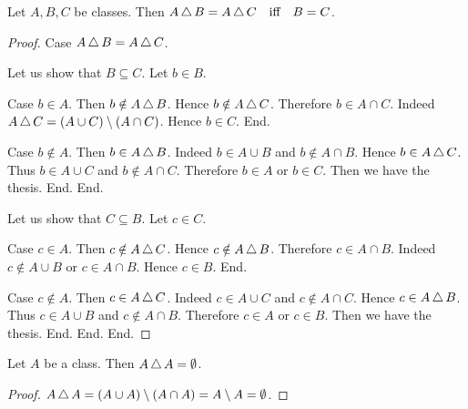 \documentclass[10pt]{article}
\begin{document}
  \begin{forthel}
    \begin{proposition}
      Let $A, B, C$ be classes.
      Then $A \mathop{\triangle} B = A \mathop{\triangle} C \quad \text{iff} \quad B = C$.
    \end{proposition}
    \begin{proof}
      Case $A \mathop{\triangle} B = A \mathop{\triangle} C$.

        Let us show that $B \subseteq C$.
          Let $b \in B$.

          Case $b \in A$.
            Then $b \notin A \mathop{\triangle} B$.
            Hence $b \notin A \mathop{\triangle} C$.
            Therefore $b \in A \cap C$.
            Indeed $A \mathop{\triangle} C = (A \cup C) \setminus (A \cap C)$.
            Hence $b \in C$.
          End.

          Case $b \notin A$.
            Then $b \in A \mathop{\triangle} B$.
            Indeed $b \in A \cup B$ and $b \notin A \cap B$.
            Hence $b \in A \mathop{\triangle} C$.
            Thus $b \in A \cup C$ and $b \notin A \cap C$.
            Therefore $b \in A$ or $b \in C$.
            Then we have the thesis.
          End.
        End.

        Let us show that $C \subseteq B$.
          Let $c \in C$.

          Case $c \in A$.
            Then $c \notin A \mathop{\triangle} C$.
            Hence $c \notin A \mathop{\triangle} B$.
            Therefore $c \in A \cap B$.
            Indeed $c \notin A \cup B$ or $c \in A \cap B$.
            Hence $c \in B$.
          End.

          Case $c \notin A$.
            Then $c \in A \mathop{\triangle} C$.
            Indeed $c \in A \cup C$ and $c \notin A \cap C$.
            Hence $c \in A \mathop{\triangle} B$.
            Thus $c \in A \cup B$ and $c \notin A \cap B$.
            Therefore $c \in A$ or $c \in B$.
            Then we have the thesis.
          End.
        End.
      End.
    \end{proof}
  \end{forthel}

  \begin{forthel}
    \begin{proposition}
      Let $A$ be a class.
      Then $A \mathop{\triangle} A = \emptyset$.
    \end{proposition}
    \begin{proof}
      $A \mathop{\triangle} A
        = (A \cup A) \setminus (A \cap A)
        = A \setminus A
        = \emptyset$.
    \end{proof}
  \end{forthel}
\end{document}
